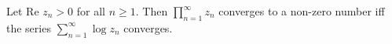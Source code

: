 Let $\text{Re } z_n > 0$ for all $n \geq 1$. Then $\prod_{n=1}^{\infty} z_n$ converges to a non-zero number iff the series $\sum_{n=1}^{\infty} \log z_n$ converges.